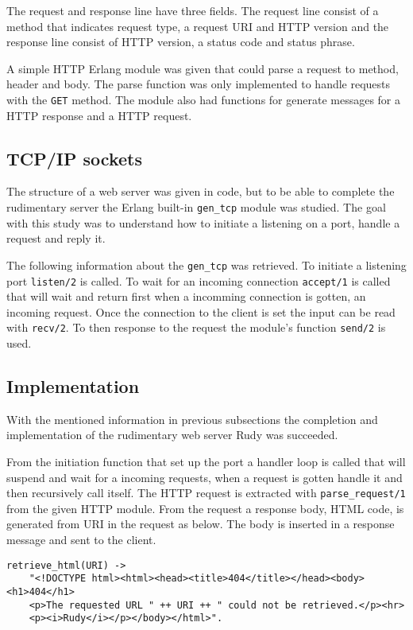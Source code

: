 \documentclass[a4paper, 11pt]{article}
\begin{document}
The request and response line have three fields. The request line consist of a method that indicates request type, a request URI and HTTP version and the response line consist of HTTP version, a status code and status phrase.

A simple HTTP Erlang module was given that could parse a request to method, header and body. The parse function was only implemented to handle requests with the \verb!GET! method. The module also had functions for generate messages for a HTTP response and a HTTP request.

\subsection{TCP/IP sockets}

The structure of a web server was given in code, but to be able to complete the rudimentary server the Erlang built-in \verb!gen_tcp! module was studied.  The goal with this study was to understand how to initiate a listening on a port, handle a request and reply it. 

The following information about the \verb!gen_tcp! was retrieved. To initiate a listening port \verb!listen/2! is called. To wait for an incoming connection \verb!accept/1! is called that will wait and return first when a incomming connection is gotten, an incoming request. Once the connection to the client is set the input can be read with \verb!recv/2!. To then response to the request the module's function \verb!send/2! is used.

\subsection{Implementation}

With the mentioned information in previous subsections the completion and implementation of the rudimentary web server Rudy was succeeded.

From the initiation function that set up the port a handler loop is called that will suspend and wait for a incoming requests, when a request is gotten handle it and then recursively call itself. The HTTP request is extracted with \verb!parse_request/1! from the given HTTP module. From the request a response body, HTML code, is generated from URI in the request as below. The body is inserted in a response message and sent to the client.

\begin{verbatim}
retrieve_html(URI) ->
    "<!DOCTYPE html><html><head><title>404</title></head><body><h1>404</h1>
    <p>The requested URL " ++ URI ++ " could not be retrieved.</p><hr>
    <p><i>Rudy</i></p></body></html>".
\end{verbatim}
\end{document}
